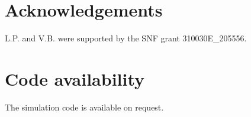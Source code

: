 
\section{Acknowledgements}
L.P. and V.B. were supported by the SNF grant 310030E\_205556.

\section{Code availability}
The simulation code is available on request.

\printbibliography[heading=subbibliography]
